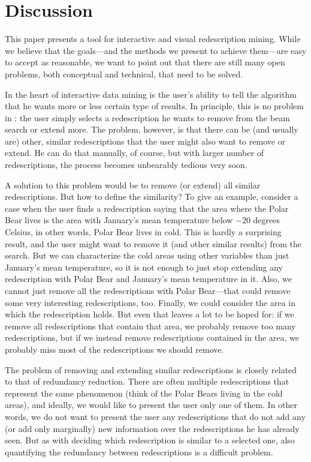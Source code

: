 \section{Discussion}

This paper presents a tool for interactive and visual redescription
mining. While we believe that the goals---and the methods we present
to achieve them---are easy to accept as reasonable, we want to point
out that there are still many open problems, both conceptual and
technical, that need to be solved. 

In the heart of interactive data mining is the user's ability to tell
the algorithm that he wants more or less certain type of results. In
principle, this is no problem in \Siren: the user simply selects a
redescription he wants to remove from the beam search or extend
more. The problem, however, is that there can be (and usually are)
other, similar redescriptions that the user might also want to remove
or extend. He can do that manually, of course, but with larger number
of redescriptions, the process becomes unbearably tedious very soon.

A solution to this problem would be to remove (or extend) all similar
redescriptions. But how to define the similarity? To give an example,
consider a case when the user finds a redescription saying that the
area where the Polar Bear lives is the area with January's mean
temperature below $-20$ degrees Celsius, in other words, Polar Bear
lives in cold. This is hardly a surprising result, and the user might
want to remove it (and other similar results) from the search. But we
can characterize the cold areas using other variables than just
January's mean temperature, so it is not enough to just stop extending
any redescription with Polar Bear and January's mean temperature in
it. Also, we cannot just remove all the redescriptions with Polar
Bear---that could remove some very interesting redescriptions,
too. Finally, we could consider the area in which the redescription
holds. But even that leaves a lot to be hoped for: if we remove all
redescriptions that contain that area, we probably remove too many
redescriptions, but if we instead remove redescriptions
 contained in the area, we probably miss most of the
redescriptions we should remove.  

The problem of removing and extending similar redescriptions is
closely related to that of redundancy reduction. There are often
multiple redescriptions that represent the same phenomenon (think of
the Polar Bears living in the cold areas), and ideally, we would like
to present the user only one of them. In other words, we do not want
to present the user any redescriptions that do not add any (or add
only marginally) new information over the redescriptions he has
already seen. But as with deciding which redescription is similar to a
selected one, also quantifying the redundancy between redescriptions
is a difficult problem.

